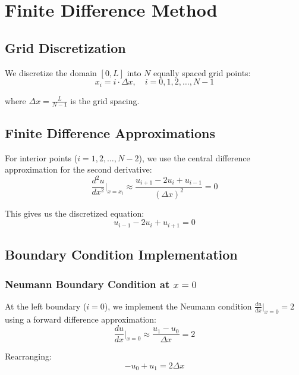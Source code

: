 \documentclass[11pt,a4paper]{article}
\begin{document}
\section{Finite Difference Method}

\subsection{Grid Discretization}

We discretize the domain $[0, L]$ into $N$ equally spaced grid points:
\begin{equation}
x_i = i \cdot \Delta x, \quad i = 0, 1, 2, \ldots, N-1
\end{equation}

where $\Delta x = \frac{L}{N-1}$ is the grid spacing.

\subsection{Finite Difference Approximations}

For interior points ($i = 1, 2, \ldots, N-2$), we use the central difference approximation for the second derivative:
\begin{equation}
\frac{d^2u}{dx^2}\bigg|_{x=x_i} \approx \frac{u_{i+1} - 2u_i + u_{i-1}}{(\Delta x)^2} = 0
\end{equation}

This gives us the discretized equation:
\begin{equation}
u_{i-1} - 2u_i + u_{i+1} = 0 \label{eq:interior}
\end{equation}

\subsection{Boundary Condition Implementation}

\subsubsection{Neumann Boundary Condition at $x = 0$}

At the left boundary ($i = 0$), we implement the Neumann condition $\frac{du}{dx}|_{x=0} = 2$ using a forward difference approximation:
\begin{equation}
\frac{du}{dx}\bigg|_{x=0} \approx \frac{u_1 - u_0}{\Delta x} = 2
\end{equation}

Rearranging:
\begin{equation}
-u_0 + u_1 = 2\Delta x \label{eq:neumann}
\end{equation}
\end{document}
